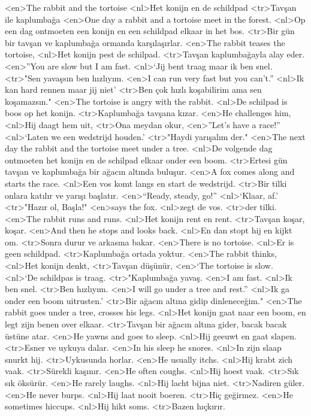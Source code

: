 <en>The rabbit and the tortoise
<nl>Het konijn en de schildpad
<tr>Tavşan ile kaplumbağa
<en>One day a rabbit and a tortoise meet in the forest.
<nl>Op een dag ontmoeten een konijn en een schildpad elkaar in het bos.
<tr>Bir gün bir tavşan ve kaplumbağa ormanda karşılaşırlar.
<en>The rabbit teases the tortoise,
<nl>Het konijn pest de schilpad.
<tr>Tavşan kaplumbağayla alay eder.
<en>”You are slow but I am fast.
<nl>`Jij bent traag maar ik ben snel.
<tr>"Sen yavaşsın ben hızlıyım.
<en>I can run very fast but you can’t.”
<nl>Ik kan hard rennen maar jij niet'
<tr>Ben çok hızlı koşabilirim ama sen koşamazsın."
<en>The tortoise is angry with the rabbit.
<nl>De schilpad is boos op het konijn.
<tr>Kaplumbağa tavşana kızar.
<en>He challenges him,
<nl>Hij daagt hem uit,
<tr>Ona meydan okur,
<en>”Let’s have a race!”
<nl>`Laten we een wedstrijd houden.'
<tr>"Haydi yarışalım der."
<en>The next day the rabbit and the tortoise meet under a tree.
<nl>De volgende dag ontmoeten het konijn en de schilpad elkaar onder een boom. 
<tr>Ertesi gün tavşan ve kaplumbağa bir ağacın altında buluşur.
<en>A fox comes along and starts the race.
<nl>Een vos komt langs en start de wedstrijd.
<tr>Bir tilki onlara katılır ve yarışı başlatır.
<en>“Ready, steady, go!”
<nl>`Klaar, af.'
<tr>"Hazır ol, Başla!"
<en>says the fox.
<nl>zegt de vos.
<tr>der tilki.
<en>The rabbit runs and runs.
<nl>Het konijn rent en rent. 
<tr>Tavşan koşar, koşar.
<en>And then he stops and looks back.
<nl>En dan stopt hij en kijkt om.
<tr>Sonra durur ve arkasına bakar.
<en>There is no tortoise.
<nl>Er is geen schildpad.
<tr>Kaplumbağa ortada yoktur.
<en>The rabbit thinks,
<nl>Het konijn denkt, 
<tr>Tavşan düşünür,
<en>`The tortoise is slow.
<nl>`De schildpas is traag.
<tr>"Kaplumbağa yavaş.
<en>I am fast.
<nl>Ik ben snel.
<tr>Ben hızlıyım.
<en>I will go under a tree and rest.”
<nl>Ik ga onder een boom uitrusten.'
<tr>Bir ağacın altına gidip dinleneceğim."
<en>The rabbit goes under a tree, crosses his legs.
<nl>Het konijn gaat naar een boom, en legt zijn benen over elkaar.
<tr>Tavşan bir ağacın altına gider, bacak bacak üstüne atar.
<en>He yawns and goes to sleep.
<nl>Hij geeuwt en gaat slapen.
<tr>Esner ve uykuya dalar.
<en>In his sleep he snores.
<nl>In zijn slaap snurkt hij. 
<tr>Uykusunda horlar.
<en>He usually itchs.
<nl>Hij krabt zich vaak.
<tr>Sürekli kaşınır.
<en>He often coughs.
<nl>Hij hoest vaak.
<tr>Sık sık öksürür.
<en>He rarely laughs.
<nl>Hij lacht bijna niet.
<tr>Nadiren güler.
<en>He never burps.
<nl>Hij laat nooit boeren.
<tr>Hiç geğirmez.
<en>He sometimes hiccups.
<nl>Hij hikt soms.
<tr>Bazen hıçkırır.
